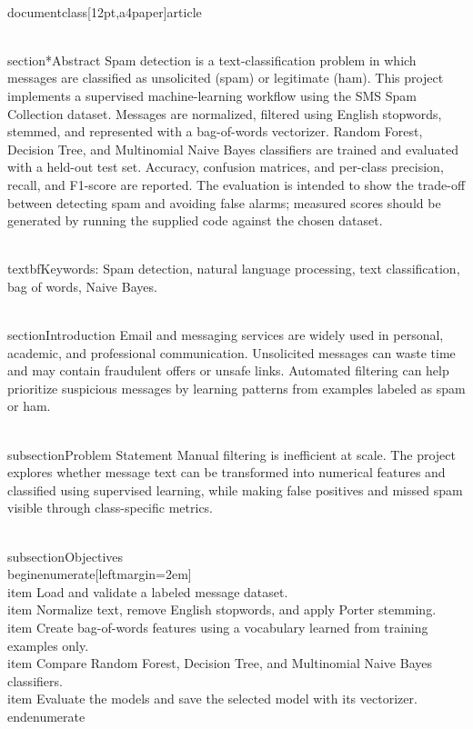 \\documentclass[12pt,a4paper]{article}
\begin{document}
\\section*{Abstract}
Spam detection is a text-classification problem in which messages are classified as unsolicited (spam) or legitimate (ham). This project implements a supervised machine-learning workflow using the SMS Spam Collection dataset. Messages are normalized, filtered using English stopwords, stemmed, and represented with a bag-of-words vectorizer. Random Forest, Decision Tree, and Multinomial Naive Bayes classifiers are trained and evaluated with a held-out test set. Accuracy, confusion matrices, and per-class precision, recall, and F1-score are reported. The evaluation is intended to show the trade-off between detecting spam and avoiding false alarms; measured scores should be generated by running the supplied code against the chosen dataset.

\\textbf{Keywords:} Spam detection, natural language processing, text classification, bag of words, Naive Bayes.

\\section{Introduction}
Email and messaging services are widely used in personal, academic, and professional communication. Unsolicited messages can waste time and may contain fraudulent offers or unsafe links. Automated filtering can help prioritize suspicious messages by learning patterns from examples labeled as spam or ham.

\\subsection{Problem Statement}
Manual filtering is inefficient at scale. The project explores whether message text can be transformed into numerical features and classified using supervised learning, while making false positives and missed spam visible through class-specific metrics.

\\subsection{Objectives}
\\begin{enumerate}[leftmargin=2em]
    \\item Load and validate a labeled message dataset.
    \\item Normalize text, remove English stopwords, and apply Porter stemming.
    \\item Create bag-of-words features using a vocabulary learned from training examples only.
    \\item Compare Random Forest, Decision Tree, and Multinomial Naive Bayes classifiers.
    \\item Evaluate the models and save the selected model with its vectorizer.
\\end{enumerate}
\end{document}
